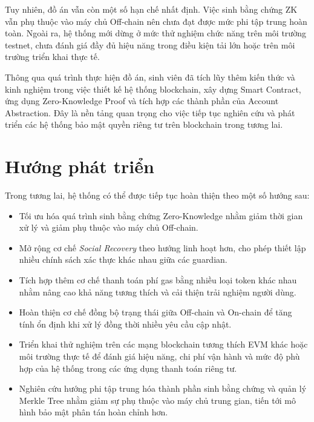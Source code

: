 \documentclass[../DoAn.tex]{subfiles}
\begin{document}
Tuy nhiên, đồ án vẫn còn một số hạn chế nhất định. Việc sinh bằng chứng ZK vẫn phụ thuộc vào máy chủ Off-chain nên chưa đạt được mức phi tập trung hoàn toàn. Ngoài ra, hệ thống mới dừng ở mức thử nghiệm chức năng trên môi trường testnet, chưa đánh giá đầy đủ hiệu năng trong điều kiện tải lớn hoặc trên môi trường triển khai thực tế.

Thông qua quá trình thực hiện đồ án, sinh viên đã tích lũy thêm kiến thức và kinh nghiệm trong việc thiết kế hệ thống blockchain, xây dựng Smart Contract, ứng dụng Zero-Knowledge Proof và tích hợp các thành phần của Account Abstraction. Đây là nền tảng quan trọng cho việc tiếp tục nghiên cứu và phát triển các hệ thống bảo mật quyền riêng tư trên blockchain trong tương lai.

\section{Hướng phát triển}

Trong tương lai, hệ thống có thể được tiếp tục hoàn thiện theo một số hướng sau:

\begin{itemize}
    \item Tối ưu hóa quá trình sinh bằng chứng Zero-Knowledge nhằm giảm thời gian xử lý và giảm phụ thuộc vào máy chủ Off-chain.
    
    \item Mở rộng cơ chế \textit{Social Recovery} theo hướng linh hoạt hơn, cho phép thiết lập nhiều chính sách xác thực khác nhau giữa các guardian.
    
    \item Tích hợp thêm cơ chế thanh toán phí gas bằng nhiều loại token khác nhau nhằm nâng cao khả năng tương thích và cải thiện trải nghiệm người dùng.
    
    \item Hoàn thiện cơ chế đồng bộ trạng thái giữa Off-chain và On-chain để tăng tính ổn định khi xử lý đồng thời nhiều yêu cầu cập nhật.
    
    \item Triển khai thử nghiệm trên các mạng blockchain tương thích EVM khác hoặc môi trường thực tế để đánh giá hiệu năng, chi phí vận hành và mức độ phù hợp của hệ thống trong các ứng dụng thanh toán riêng tư.
    
    \item Nghiên cứu hướng phi tập trung hóa thành phần sinh bằng chứng và quản lý Merkle Tree nhằm giảm sự phụ thuộc vào máy chủ trung gian, tiến tới mô hình bảo mật phân tán hoàn chỉnh hơn.
\end{itemize}
\end{document}
